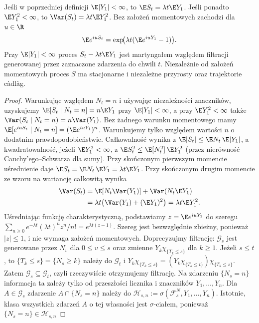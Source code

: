 \begin{twierdzenie}
Jeśli w poprzedniej definicji $\E|Y_1|<\infty$, to $\E S_t=\lambda t\E Y_1$.
Jeśli ponadto $\E Y_1^2<\infty$, to
$\Var(S_t)=\lambda t\E Y_1^2$.
Bez założeń momentowych zachodzi dla $u\in\R$
\[
\E e^{iuS_t}=\exp\!\bigl(\lambda t(\E e^{iuY_1}-1)\bigr).
\]
Przy $\E|Y_1|<\infty$ proces
$S_t-\lambda t\E Y_1$ jest martyngałem względem
filtracji generowanej przez zaznaczone zdarzenia do chwili $t$.
Niezależnie od założeń momentowych proces $S$ ma stacjonarne
i niezależne przyrosty oraz trajektorie c\`adl\`ag.
\end{twierdzenie}
\begin{proof}
Warunkując względem $N_t=n$ i używając niezależności znaczników,
uzyskujemy $\E[S_t\mid N_t=n]=n\E Y_1$ przy
$\E|Y_1|<\infty$, a przy $\E Y_1^2<\infty$ także
$\Var(S_t\mid N_t=n)=n\Var(Y_1)$.
Bez żadnego warunku momentowego mamy
$\E[e^{iuS_t}\mid N_t=n]=(\E e^{iuY_1})^n$.
Warunkujemy tylko względem wartości $n$ o dodatnim
prawdopodobieństwie. Całkowalność wynika z
$\E|S_t|\le\E N_t\,\E|Y_1|$, a kwadratowalność,
jeżeli $\E Y_1^2<\infty$, z
$\E S_t^2\le\E[N_t^2]\,\E Y_1^2$
(przez nierówność Cauchy'ego--Schwarza dla sumy).
Przy skończonym pierwszym momencie uśrednienie daje
$\E S_t=\E N_t\,\E Y_1=\lambda t\E Y_1$.
Przy skończonym drugim momencie ze wzoru
na wariancję całkowitą wynika
\begin{align*}
\Var(S_t)&=\E[N_t\Var(Y_1)]
 +\Var(N_t\E Y_1)\\
&=\lambda t\bigl(\Var(Y_1)+(\E Y_1)^2\bigr)
=\lambda t\E Y_1^2.
\end{align*}
Uśredniając funkcję charakterystyczną, podstawiamy
$z=\E e^{iuY_1}$ do szeregu
$\sum_{n\ge0}e^{-\lambda t}(\lambda t)^n z^n/n!
=e^{\lambda t(z-1)}$. Szereg jest bezwzględnie zbieżny,
ponieważ $|z|\le1$, i nie wymaga założeń momentowych.
Doprecyzujmy filtrację: $\mathcal G_s$ jest generowane przez
$N_v$ dla $0\le v\le s$ oraz zmienne
$Y_k\chi_{\{T_k\le s\}}$ dla $k\ge1$.
Jeżeli $s\le t$, to $\{T_k\le s\}=\{N_s\ge k\}$
należy do $\mathcal G_t$ i
$Y_k\chi_{\{T_k\le s\}}=
(Y_k\chi_{\{T_k\le t\}})\chi_{\{T_k\le s\}}$.
Zatem $\mathcal G_s\subseteq\mathcal G_t$, czyli
rzeczywiście otrzymujemy filtrację.
Na zdarzeniu $\{N_s=n\}$ informacja ta zależy tylko
od przeszłości licznika i znaczników $Y_1,\ldots,Y_n$.
Dla $A\in\mathcal G_s$ zdarzenie $A\cap\{N_s=n\}$
należy do $\mathcal H_{s,n}:=\sigma(\mathcal F_s^N,Y_1,\ldots,Y_n)$.
Istotnie, klasa wszystkich zdarzeń $A$ o tej własności
jest $\sigma$-ciałem, ponieważ $\{N_s=n\}\in\mathcal H_{s,n}$

\end{proof}
